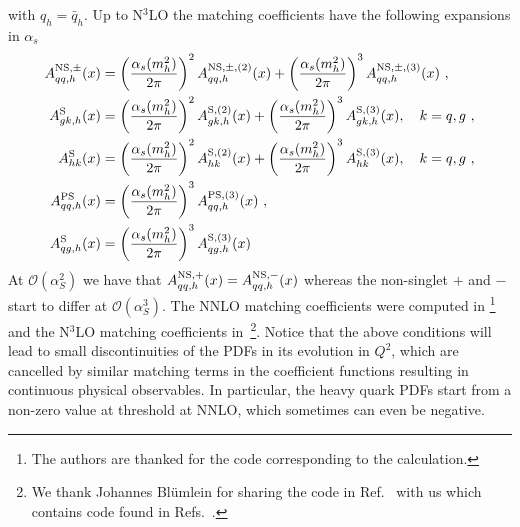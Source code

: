 with $q_h=\bar{q}_h$. Up to N$^3$LO the matching coefficients have the
following expansions in $\alpha_s$
\begin{align}
  A^{\rm NS,\pm}_{qq,h}(x) & = \left( \frac{\alpha_s(m_h^2)}{2\pi} \right)^2
  A^{\rm NS,\pm,(2)}_{qq,h}(x) + \left( \frac{\alpha_s(m_h^2)}{2\pi} \right)^3
  A^{\rm NS,\pm,(3)}_{qq,h}(x) \ , \nonumber \\
  A^{\rm S}_{gk,h}(x) & = \left( \frac{\alpha_s(m_h^2)}{2\pi} \right)^2
  A^{\rm S,(2)}_{gk,h}(x) + \left( \frac{\alpha_s(m_h^2)}{2\pi} \right)^3
  A^{\rm S,(3)}_{gk,h}(x), \quad k=q,g \ , \nonumber \\
  A^{\rm S}_{hk}(x) & = \left( \frac{\alpha_s(m_h^2)}{2\pi} \right)^2
  A^{\rm S,(2)}_{hk}(x) + \left( \frac{\alpha_s(m_h^2)}{2\pi} \right)^3
  A^{\rm S,(3)}_{hk}(x), \quad k=q,g \ , \nonumber \\
  A^{\rm PS}_{qq,h}(x) & = \left( \frac{\alpha_s(m_h^2)}{2\pi} \right)^3
  A^{\rm PS,(3)}_{qq,h}(x) \ , \nonumber \\
  A^{\rm S}_{qg,h}(x) & = \left( \frac{\alpha_s(m_h^2)}{2\pi} \right)^3
  A^{\rm S,(3)}_{qg,h}(x)
\end{align}
At $\mathcal{O}(\alpha_S^2)$ we have that $A^{\rm NS,+}_{qq,h}(x) =
A^{\rm NS,-}_{qq,h}(x)$ whereas the non-singlet $+$ and $-$ start to
differ at $\mathcal{O}(\alpha_S^3)$. The NNLO matching coefficients
were computed in \cite{NNLO-MTM}\footnote{The authors are thanked for
the code corresponding to the calculation.} and the N$^3$LO matching
coefficients
in~\cite{Bierenbaum:2009mv,Ablinger:2010ty,Kawamura:2012cr,Blumlein:2012vq,ABLINGER2014263,Ablinger:2014nga,Ablinger:2014vwa,Behring:2014eya,Ablinger:2019etw,Behring:2021asx,Ablinger:2023ahe,Ablinger:2024xtt}\footnote{We
thank Johannes Bl\"umlein for sharing the code in
Ref.~\cite{BlumleinCode} with us which contains code found in
Refs.~\cite{Ablinger:2024xtt,Fael:2022miw}.}.  Notice that the above
conditions will lead to small discontinuities of the PDFs in its
evolution in $Q^2$, which are cancelled by similar matching terms in
the coefficient functions resulting in continuous physical
observables. In particular, the heavy quark PDFs start from a non-zero
value at threshold at NNLO, which sometimes can even be negative.

